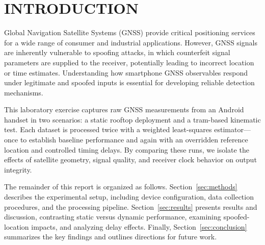 
\section{INTRODUCTION} \label{sec:introduction}


    Global Navigation Satellite Systems (GNSS) provide critical positioning services for a wide range of consumer and industrial applications. However, GNSS signals are inherently vulnerable to spoofing attacks, in which counterfeit signal parameters are supplied to the receiver, potentially leading to incorrect location or time estimates. Understanding how smartphone GNSS observables respond under legitimate and spoofed inputs is essential for developing reliable detection mechanisms.

    This laboratory exercise captures raw GNSS measurements from an Android handset in two scenarios: a static rooftop deployment and a tram-based kinematic test. Each dataset is processed twice with a weighted least-squares estimator—once to establish baseline performance and again with an overridden reference location and controlled timing delays. By comparing these runs, we isolate the effects of satellite geometry, signal quality, and receiver clock behavior on output integrity.

    The remainder of this report is organized as follows. Section~\ref{sec:methods} describes the experimental setup, including device configuration, data collection procedures, and the processing pipeline. Section~\ref{sec:results} presents results and discussion, contrasting static versus dynamic performance, examining spoofed-location impacts, and analyzing delay effects. Finally, Section~\ref{sec:conclusion} summarizes the key findings and outlines directions for future work.